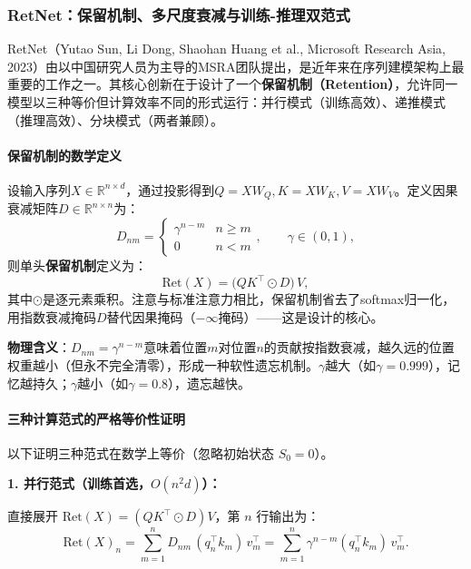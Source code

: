 \documentclass[12pt,a4paper]{article}
\begin{document}
\subsubsection{RetNet：保留机制、多尺度衰减与训练-推理双范式}
\label{sec:retnet}

RetNet（Yutao Sun, Li Dong, Shaohan Huang et al., Microsoft Research Asia, 2023）由以中国研究人员为主导的MSRA团队提出，是近年来在序列建模架构上最重要的工作之一。其核心创新在于设计了一个\textbf{保留机制（Retention）}，允许同一模型以三种等价但计算效率不同的形式运行：并行模式（训练高效）、递推模式（推理高效）、分块模式（两者兼顾）。

\paragraph{保留机制的数学定义}

设输入序列$X \in \mathbb{R}^{n \times d}$，通过投影得到$Q = XW_Q, K = XW_K, V = XW_V$。定义因果衰减矩阵$D \in \mathbb{R}^{n\times n}$为：
\begin{equation}
D_{nm} = \begin{cases} \gamma^{n-m} & n \ge m \\ 0 & n < m \end{cases},\qquad \gamma \in (0,1),
\end{equation}
则单头\textbf{保留机制}定义为：
\begin{equation}
\text{Ret}(X) = \bigl(Q K^\top \odot D\bigr)\, V,
\end{equation}
其中$\odot$是逐元素乘积。注意与标准注意力相比，保留机制省去了softmax归一化，用指数衰减掩码$D$替代因果掩码（$-\infty$掩码）——这是设计的核心。

\textbf{物理含义}：$D_{nm} = \gamma^{n-m}$意味着位置$m$对位置$n$的贡献按指数衰减，越久远的位置权重越小（但永不完全清零），形成一种软性遗忘机制。$\gamma$越大（如$\gamma = 0.999$），记忆越持久；$\gamma$越小（如$\gamma = 0.8$），遗忘越快。

\paragraph{三种计算范式的严格等价性证明}

以下证明三种范式在数学上等价（忽略初始状态 $S_0 = 0$）。

\textbf{1. 并行范式（训练首选，$O(n^2 d)$）：}

直接展开 $\mathrm{Ret}(X) = (QK^\top \odot D) V$，第 $n$ 行输出为：
\begin{equation}
\mathrm{Ret}(X)_n = \sum_{m=1}^n D_{nm}\, (q_n^\top k_m)\, v_m^\top
= \sum_{m=1}^n \gamma^{n-m} (q_n^\top k_m)\, v_m^\top.
\end{equation}
\end{document}

